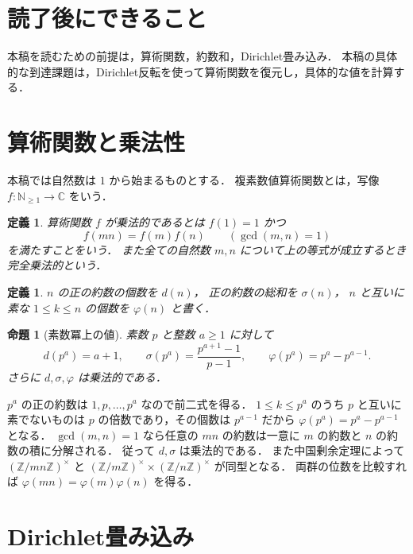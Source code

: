 \documentclass[a5paper,10pt,onecolumn]{jsarticle}
\makeatletter
\theoremstyle{mathnotetheorem}
\newtheorem{definition}[theorem]{定義}
\newtheorem{proposition}[theorem]{命題}
\renewcommand{\proofname}{証明}
\renewenvironment{proof}[1][\proofname]{%
  \par\pushQED{\qed}\normalfont\topsep4\p@\@plus2\p@\relax
  \trivlist\item[\hskip\labelsep\bfseries #1]\ignorespaces
}{\popQED\endtrivlist\@endpefalse}
\makeatother
\begin{document}
\section*{読了後にできること}
本稿を読むための前提は，算術関数，約数和，Dirichlet畳み込み．
本稿の具体的な到達課題は，Dirichlet反転を使って算術関数を復元し，具体的な値を計算する．


\section{算術関数と乗法性}

本稿では自然数は $1$ から始まるものとする．
複素数値算術関数とは，写像
$f:\mathbb N_{\ge1}\to\mathbb C$ をいう．

\begin{definition}
算術関数 $f$ が\emph{乗法的}であるとは
$f(1)=1$ かつ
\[
 f(mn)=f(m)f(n)\qquad(\gcd(m,n)=1)
\]
を満たすことをいう．
また全ての自然数 $m,n$ について上の等式が成立するとき
\emph{完全乗法的}という．
\end{definition}

\begin{definition}
$n$ の正の約数の個数を $d(n)$，
正の約数の総和を $\sigma(n)$，
$n$ と互いに素な $1\le k\le n$ の個数を
$\varphi(n)$ と書く．
\end{definition}

\begin{proposition}[素数冪上の値]\label{prop:basic-values}
素数 $p$ と整数 $a\ge1$ に対して
\[
 d(p^a)=a+1,\qquad
 \sigma(p^a)=\frac{p^{a+1}-1}{p-1},\qquad
 \varphi(p^a)=p^a-p^{a-1}.
\]
さらに $d,\sigma,\varphi$ は乗法的である．
\end{proposition}
\begin{proof}
$p^a$ の正の約数は
$1,p,\ldots,p^a$ なので前二式を得る．
$1\le k\le p^a$ のうち $p$ と互いに素でないものは
$p$ の倍数であり，その個数は $p^{a-1}$ だから
$\varphi(p^a)=p^a-p^{a-1}$ となる．
$\gcd(m,n)=1$ なら任意の $mn$ の約数は一意に
$m$ の約数と $n$ の約数の積に分解される．
従って $d,\sigma$ は乗法的である．
また中国剰余定理によって
$(\mathbb Z/mn\mathbb Z)^\times$ と
$(\mathbb Z/m\mathbb Z)^\times
 \times(\mathbb Z/n\mathbb Z)^\times$
が同型となる．
両群の位数を比較すれば
$\varphi(mn)=\varphi(m)\varphi(n)$ を得る．
\end{proof}

\section{Dirichlet畳み込み}
\end{document}

